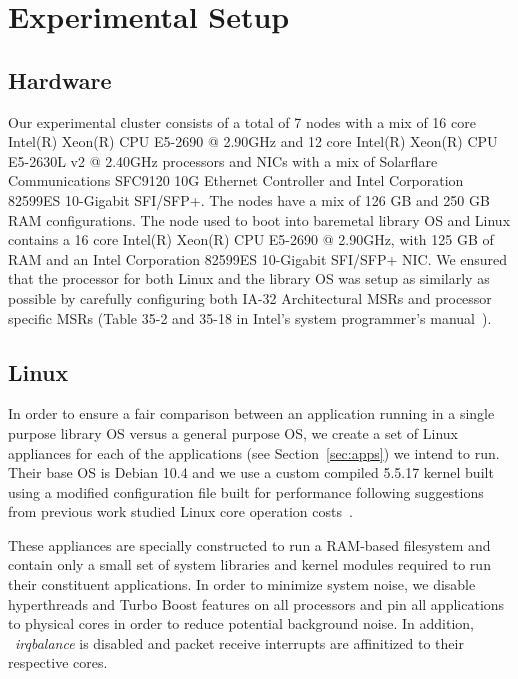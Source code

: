 

\section{Experimental Setup}

\label{sec:exp_setup}
\subsection{Hardware}
Our experimental cluster consists of a total of 7 nodes with a mix of 16 core
Intel(R) Xeon(R) CPU E5-2690 @ 2.90GHz and 12 core Intel(R) Xeon(R) CPU
E5-2630L v2 @ 2.40GHz processors and NICs with a mix of Solarflare
Communications SFC9120 10G Ethernet Controller and Intel Corporation 82599ES
10-Gigabit SFI/SFP+.
The nodes have a mix of 126 GB and 250 GB RAM configurations.
The node used to boot into baremetal library OS and Linux contains a 16 core
Intel(R) Xeon(R) CPU E5-2690 @ 2.90GHz, with 125 GB of RAM and an Intel
Corporation 82599ES 10-Gigabit SFI/SFP+ NIC.
We ensured that the processor for both Linux and the library OS was setup as
similarly as possible by carefully configuring both IA-32 Architectural MSRs
and processor specific MSRs (Table 35-2 and 35-18 in Intel's system
programmer's manual~\cite{intel_msr}).

\subsection{Linux}
In order to ensure a fair comparison between an application running in a single
purpose library OS versus a general purpose OS, we create a set of Linux
appliances for each of the applications (see Section~\ref{sec:apps}) we intend
to run.
Their base OS is Debian 10.4 and we use a custom compiled 5.5.17 kernel built
using a modified configuration file built for performance following suggestions
from previous work studied Linux core operation
costs~\cite{10.1145/3341301.3359640}.

These appliances are specially constructed to run a RAM-based filesystem and
contain only a small set of system libraries and kernel modules required to run
their constituent applications. In order to minimize system noise, we disable
hyperthreads and Turbo Boost features on all  processors and pin all
applications to physical cores in order to reduce potential background noise.
In addition, ~\textit{irqbalance} is disabled and packet receive interrupts are
affinitized to their respective cores.

